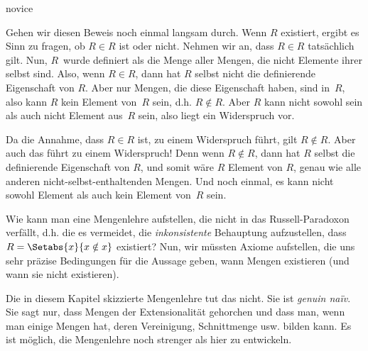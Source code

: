 \documentclass[../../../include/open-logic-section]{subfiles}
\begin{document}
\begin{tagblock}{novice}
\begin{explain}
Gehen wir diesen Beweis noch einmal langsam durch. Wenn $R$ existiert,
ergibt es Sinn zu fragen, ob $R \in
R$ ist oder nicht. Nehmen wir an, dass $R \in R$ tatsächlich gilt.
Nun, $R$~wurde definiert als die Menge aller
Mengen, die nicht Elemente ihrer selbst sind. Also, wenn $R \in R$,
dann hat $R$ selbst nicht die definierende Eigenschaft von $R$. Aber nur Mengen,
die diese Eigenschaft haben, sind in~$R$, also kann $R$ kein Element
von~$R$ sein, d.h. $R \notin R$. Aber $R$ kann nicht sowohl sein als auch nicht
Element aus~$R$ sein, also liegt ein Widerspruch vor.

Da die Annahme, dass $R \in R$ ist, zu einem Widerspruch führt, gilt
$R \notin R$. Aber auch das führt zu einem Widerspruch! Denn wenn $R
\notin R$, dann hat $R$ selbst die definierende Eigenschaft von $R$, und somit wäre $R$
Element von $R$, genau wie alle anderen nicht-selbst-enthaltenden Mengen.
Und noch einmal, es kann nicht sowohl Element als auch kein Element von~$R$ sein.
\end{explain}
\end{tagblock}

\begin{digress}
Wie kann man eine Mengenlehre aufstellen, die nicht in das
Russell-Paradoxon verfällt, d.h. die es vermeidet, die \emph{inkonsistente}
Behauptung aufzustellen, dass $R = \Setabs{x}{x \notin x}$ existiert?
Nun, wir müssten
Axiome aufstellen, die uns sehr präzise Bedingungen für die Aussage geben, wann
Mengen existieren (und wann sie nicht existieren). 
	
Die in diesem Kapitel skizzierte Mengenlehre tut das nicht. Sie ist
\emph{genuin na\"iv}. Sie sagt nur, dass Mengen der Extensionalität gehorchen
und dass man, wenn man einige Mengen hat, deren
Vereinigung, Schnittmenge usw. bilden kann. Es ist möglich, die Mengenlehre noch
strenger als hier zu entwickeln. 
\end{digress}
\end{document}
